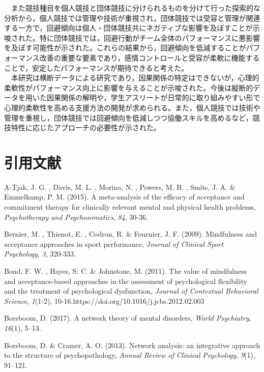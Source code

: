 \documentclass[12pt,a4paper,xelatex,ja=standard]{bxjsarticle}
\begin{document}
　また競技種目を個人競技と団体競技に分けられるものを分けて行った探索的な分析から，個人競技では管理や技術が重視され，団体競技では受容と管理が関連する一方で，回避傾向は個人・団体競技共にネガティブな影響を及ぼすことが示唆された。特に団体競技では，回避行動がチーム全体のパフォーマンスに悪影響を及ぼす可能性が示された。これらの結果から，回避傾向を低減することがパフォーマンス改善の重要な要素であり，感情コントロールと受容が柔軟に機能することで，安定したパフォーマンスが期待できると考えた。\\
　本研究は横断データによる研究であり，因果関係の特定はできないが，心理的柔軟性がパフォーマンス向上に影響を与えることが示唆された。今後は縦断的データを用いた因果関係の解明や，学生アスリートが日常的に取り組みやすい形で心理的柔軟性を高める支援方法の開発が求められる。また，個人競技では技術や管理を重視し，団体競技では回避傾向を低減しつつ協働スキルを高めるなど，競技特性に応じたアプローチの必要性が示された。

\clearpage

\hypertarget{ux5f15ux7528ux6587ux732e}{%
\section{引用文献}\label{ux5f15ux7528ux6587ux732e}}

\noindent \begingroup \setlength{\parindent}{-0.3in}
\setlength{\leftskip}{0.2in} \setlength{\parskip}{8pt}

A-Tjak, J. G. , Davis, M. L. , Morina, N. , Powers, M. B. , Smits, J. A.
\& Emmelkamp, P. M. (2015). A meta-analysis of the efficacy of
acceptance and commitment therapy for clinically relevant mental and
physical health problems, \emph{Psychotherapy and Psychosomatics},
\emph{84}, 30-36.

Bernier, M. , Thienot, E. , Codron, R. \& Fournier, J. F. (2009).
Mindfulness and acceptance approaches in sport performance,
\emph{Journal of Clinical Sport Psychology}, \emph{3}, 320-333.

Bond, F. W. , Hayes, S. C. \& Johnstone, M. (2011). The value of
mindfulness and acceptance-based approaches in the assessment of
psychological flexibility and the treatment of psychological
dysfunction, \emph{Journal of Contextual Behavioral Science},
\emph{1}(1-2), 10-16.https://doi.org/10.1016/j.jcbs.2012.02.003

Borsboom, D. (2017). A network theory of mental disorders,
\emph{World Psychiatry}, \emph{16}(1), 5--13.

Borsboom, D. \& Cramer, A. O. (2013). Network analysis: an integrative
approach to the structure of psychopathology,
\emph{Annual Review of Clinical Psychology}, \emph{9}(1), 91--121.
\end{document}
